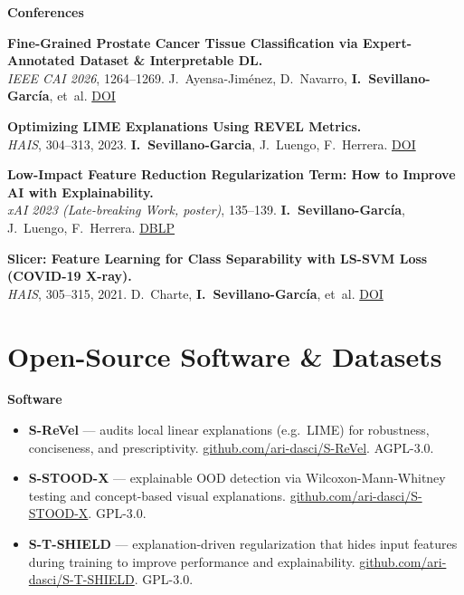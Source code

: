 \documentclass[10pt,a4paper]{article}
\newcommand{\blueitem}[1]{\textcolor{subtitleblue}{\textbf{#1}}}
\newcommand{\sub}[1]{\textcolor{subtle}{\footnotesize #1}}
\begin{document}
\blueitem{Conferences}

\textbf{Fine-Grained Prostate Cancer Tissue Classification via Expert-Annotated Dataset \& Interpretable DL.} \\
\sub{\textit{IEEE CAI 2026}, 1264--1269. J.~Ayensa-Jiménez, D.~Navarro, \textbf{I.~Sevillano-García}, et~al. \href{https://doi.org/10.1109/CAI68641.2026.11536250}{DOI}}

\textbf{Optimizing LIME Explanations Using REVEL Metrics.} \\
\sub{\textit{HAIS}, 304--313, 2023. \textbf{I.~Sevillano-Garcia}, J.~Luengo, F.~Herrera. \href{https://doi.org/10.1007/978-3-031-40725-3_26}{DOI}}

\textbf{Low-Impact Feature Reduction Regularization Term: How to Improve AI with Explainability.} \\
\sub{\textit{xAI 2023 (Late-breaking Work, poster)}, 135--139. \textbf{I.~Sevillano-García}, J.~Luengo, F.~Herrera. \href{https://dblp.org/rec/conf/xai/Sevillano-Garcia23}{DBLP}}

\textbf{Slicer: Feature Learning for Class Separability with LS-SVM Loss (COVID-19 X-ray).} \\
\sub{\textit{HAIS}, 305--315, 2021. D.~Charte, \textbf{I.~Sevillano-García}, et~al. \href{https://doi.org/10.978-3-030-86271-8_26}{DOI}}

\normalsize

\section*{Open-Source Software \& Datasets}

\blueitem{Software}
\begin{itemize}
    \item \textbf{S-ReVel} --- audits local linear explanations (e.g.\ LIME) for robustness, conciseness, and prescriptivity. \href{https://github.com/ari-dasci/S-ReVel}{github.com/ari-dasci/S-ReVel}. AGPL-3.0.
    \item \textbf{S-STOOD-X} --- explainable OOD detection via Wilcoxon-Mann-Whitney testing and concept-based visual explanations. \href{https://github.com/ari-dasci/S-STOOD-X}{github.com/ari-dasci/S-STOOD-X}. GPL-3.0.
    \item \textbf{S-T-SHIELD} --- explanation-driven regularization that hides input features during training to improve performance and explainability. \href{https://github.com/ari-dasci/S-T-SHIELD}{github.com/ari-dasci/S-T-SHIELD}. GPL-3.0.
\end{itemize}
\end{document}

